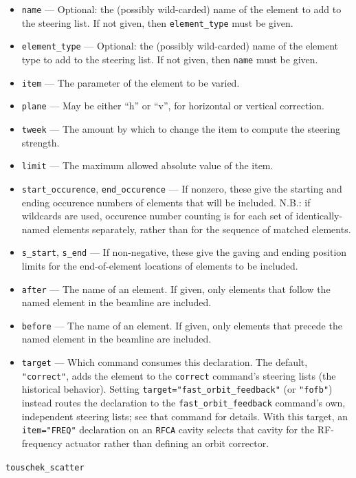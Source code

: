 \documentclass[11pt]{article}
\begin{document}
\begin{itemize}
\item \verb|name| --- Optional: the (possibly wild-carded) name of the element to add to the steering list.
        If not given, then \verb|element_type| must be given.
\item \verb|element_type| --- Optional: the (possibly wild-carded) name of the element type to add to the
        steering list.  If not given, then \verb|name| must be given.
\item \verb|item| --- The parameter of the element to be varied.
\item \verb|plane| --- May be either ``h'' or ``v'', for horizontal or vertical correction.
\item \verb|tweek| --- The amount by which to change the item to compute the steering strength.
\item \verb|limit| --- The maximum allowed absolute value of the item.
\item \verb|start_occurence|, \verb|end_occurence| --- If nonzero, these give the starting and
 ending occurence numbers of elements that will be included. N.B.: if wildcards are used, occurence
 number counting is for each set of identically-named elements separately, rather than for the sequence
 of matched elements.
\item \verb|s_start|, \verb|s_end| --- If non-negative, these give the gaving and ending position
 limits for the end-of-element locations of elements to be included.
\item \verb|after| --- The name of an element.  If given, only elements
 that follow the named element in the beamline are included.  
\item \verb|before| --- The name of an element. If given, only elements
 that precede the named element in the beamline are included.
\item \verb|target| --- Which command consumes this declaration.  The default,
 \verb|"correct"|, adds the element to the \verb|correct| command's steering lists (the
 historical behavior).  Setting \verb|target="fast_orbit_feedback"| (or \verb|"fofb"|)
 instead routes the declaration to the \verb|fast_orbit_feedback| command's own,
 independent steering lists; see that command for details.  With this target, an
 \verb|item="FREQ"| declaration on an \verb|RFCA| cavity selects that cavity for the
 RF-frequency actuator rather than defining an orbit corrector.
\end{itemize}

\newpage
\begin{center}{\Large\verb|touschek_scatter|}\end{center}
\end{document}
